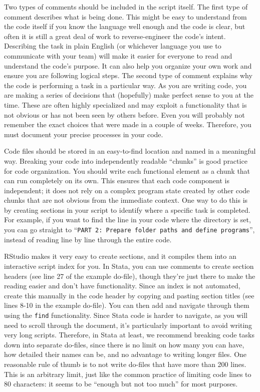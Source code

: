 Two types of comments should be included in the script itself.
The first type of comment describes what is being done.
This might be easy to understand from the code itself
if you know the language well enough and the code is clear,
but often it is still a great deal of work to reverse-engineer the code's intent.
Describing the task in plain English (or whichever language you use to communicate with your team)
will make it easier for everyone to read and understand the code's purpose.
It can also help you organize your own work and ensure you are following logical steps.
The second type of comment explains why the code is performing a task in a particular way.
As you are writing code, you are making a series of decisions that
(hopefully) make perfect sense to you at the time.
These are often highly specialized and may exploit a functionality
that is not obvious or has not been seen by others before.
Even you will probably not remember the exact choices that were made in a couple of weeks.
Therefore, you must document your precise processes in your code.

Code files should be stored in an easy-to-find location and named in a meaningful way.
Breaking your code into independently readable ``chunks'' is good practice for code organization.
You should write each functional element as a chunk that can run completely on its own.
This ensures that each code component is independent;
it does not rely on a complex program state
created by other code chunks that are not obvious from the immediate context.
One way to do this is by creating sections in your script to identify where a specific task is completed.
For example, if you want to find the line in your code where the directory is set,
you can go straight to ``\texttt{PART 2: Prepare folder paths and define programs}'',
instead of reading line by line through the entire code.

RStudio makes it very easy to create sections,
and it compiles them into an interactive script index for you.
In Stata, you can use comments to create section headers
(see line 27 of the example do-file),
though they're just there to make the reading easier and don't have functionality.
Since an index is not automated,
create this manually in the code header by copying and pasting section titles
(see lines 8-10 in the example do-file).
You can then add and navigate through them using the \texttt{find} functionality.
Since Stata code is harder to navigate, as you will need to scroll through the document,
it's particularly important to avoid writing very long scripts.
Therefore, in Stata at least, we recommend breaking code tasks down
into separate do-files, since there is no limit on how many you can have,
how detailed their names can be, and no advantage to writing longer files.
One reasonable rule of thumb is to not write do-files that have more than 200 lines.
This is an arbitrary limit, just like the common practice of limiting code lines to 80 characters:
it seems to be ``enough but not too much'' for most purposes.

